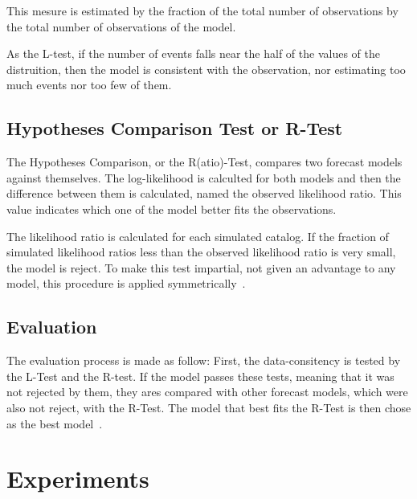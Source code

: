 This mesure is estimated by the fraction of the total number of
observations by the total number of observations of the model.

As the L-test, if the number of events falls near the half of the
values of the distruition, then the model is consistent with the
observation, nor estimating too much events nor too few of them.

\subsection{Hypotheses Comparison Test or R-Test}

The Hypotheses Comparison, or the R(atio)-Test, compares two forecast
models against themselves. The log-likelihood is calculted for both
models and then the difference between them is calculated, named the
observed likelihood ratio. This value indicates which one of the model
better fits the observations.

The likelihood ratio is calculated for each simulated catalog. If the
fraction of simulated likelihood ratios less than the observed
likelihood ratio is very small, the model is reject.  To make this
test impartial, not given an advantage to any model, this procedure is
applied symmetrically~\cite{schorlemmer2010first}.


\subsection{Evaluation}\label{eval}
The evaluation process is made as follow: First, the data-consitency
is tested by the L-Test and the R-test. If the model passes these
tests, meaning that it was not rejected by them, they ares compared
with other forecast models, which were also not reject, with the
R-Test. The model that best fits the R-Test is then chose as the best
model~\cite{schorlemmer2007earthquake}.

\section{Experiments}\label{exp}

